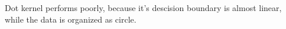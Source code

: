 \begin{answer}
Dot kernel performs poorly, because it's descision boundary is almost linear, while the data is organized as circle.
\end{answer}
